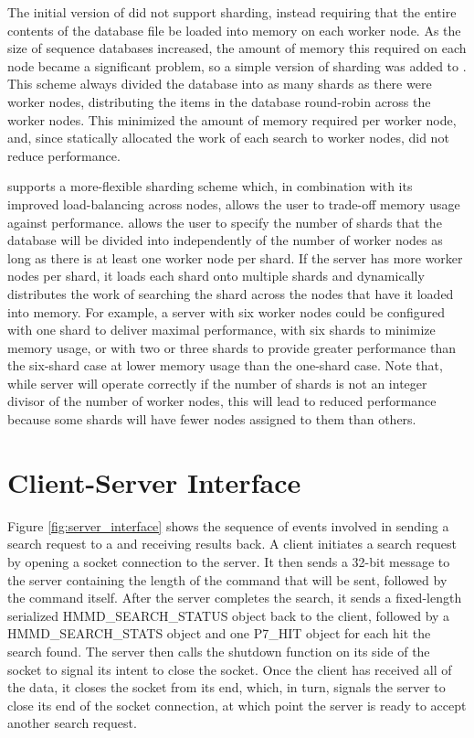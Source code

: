 \documentclass[notoc,justified,openany]{tufte-book}    %
\newcommand{\hmmserver}{\mono{hmmserver}\xspace}
\newcommand{\Hmmserver}{\mono{Hmmserver}\xspace}
\newcommand{\hmmpgmd}{\mono{hmmpgmd}\xspace}
\begin{document}
The initial version of \hmmpgmd did not support sharding, instead requiring that the entire contents of the database file be loaded into memory on each worker node.  As the size of sequence databases increased, the amount of memory this required on each node became a significant problem, so a simple version of sharding was added to \hmmpgmd.  This scheme always divided the database into as many shards as there were worker nodes, distributing the items in the database round-robin across the worker nodes.  This minimized the amount of memory required per worker node, and, since \hmmpgmd statically allocated the work of each search to worker nodes, did not reduce performance.

\Hmmserver supports a more-flexible sharding scheme which, in combination with its improved load-balancing across nodes, allows the user to trade-off memory usage against performance.  \Hmmserver allows the user to specify the number of shards that the database will be divided into independently of the number of worker nodes as long as there is at least one worker node per shard.  If the server has more worker nodes per shard, it loads each shard onto multiple shards and dynamically distributes the work of searching the shard across the nodes that have it loaded into memory.  For example, a server with six worker nodes could be configured with one shard to deliver maximal performance, with six shards to minimize memory usage, or with two or three shards to provide greater performance than the six-shard case at lower memory usage than the one-shard case.  Note that, while server will operate correctly if the number of shards is not an integer divisor of the number of worker nodes, this will lead to reduced performance because some shards will have fewer nodes assigned to them than others.

\section{Client-Server Interface}
Figure \ref{fig:server_interface} shows the sequence of events involved in sending a search request to a \hmmserver and receiving results back.  A client initiates a search request by opening a socket connection to the server.  It then sends a 32-bit message to the server containing the length of the command that will be sent, followed by the command itself.  After the server completes the search, it sends a fixed-length serialized {HMMD\_SEARCH\_STATUS} object back to the client, followed by a {HMMD\_SEARCH\_STATS} object and one {P7\_HIT} object for each hit the search found.  The server then calls the shutdown function on its side of the socket to signal its intent to close the socket.  Once the client has received all of the data, it closes the socket from its end, which, in turn, signals the server to close its end of the socket connection, at which point the server is ready to accept another search request.
\end{document}
